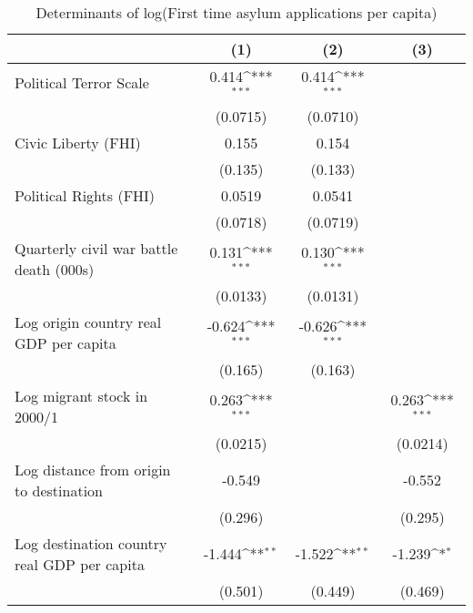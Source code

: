 \begin{table}[htbp]\centering
\def\sym#1{\ifmmode^{#1}\else\(^{#1}\)\fi}
\caption{Determinants of log(First time asylum applications per capita)}
\begin{tabular}{l*{3}{c}}
\hline\hline
                    &\multicolumn{1}{c}{(1)}         &\multicolumn{1}{c}{(2)}         &\multicolumn{1}{c}{(3)}         \\
\hline
Political Terror Scale&       0.414\sym{***}&       0.414\sym{***}&                     \\
                    &    (0.0715)         &    (0.0710)         &                     \\
[1em]
Civic Liberty (FHI) &       0.155         &       0.154         &                     \\
                    &     (0.135)         &     (0.133)         &                     \\
[1em]
Political Rights (FHI)&      0.0519         &      0.0541         &                     \\
                    &    (0.0718)         &    (0.0719)         &                     \\
[1em]
Quarterly civil war battle death (000s)&       0.131\sym{***}&       0.130\sym{***}&                     \\
                    &    (0.0133)         &    (0.0131)         &                     \\
[1em]
Log origin country real GDP per capita&      -0.624\sym{***}&      -0.626\sym{***}&                     \\
                    &     (0.165)         &     (0.163)         &                     \\
[1em]
Log migrant stock in 2000/1&       0.263\sym{***}&                     &       0.263\sym{***}\\
                    &    (0.0215)         &                     &    (0.0214)         \\
[1em]
Log distance from origin to destination&      -0.549         &                     &      -0.552         \\
                    &     (0.296)         &                     &     (0.295)         \\
[1em]
Log destination country real GDP per capita&      -1.444\sym{**} &      -1.522\sym{**} &      -1.239\sym{*}  \\
                    &     (0.501)         &     (0.449)         &     (0.469)         \\

\end{tabular}
\end{table}
